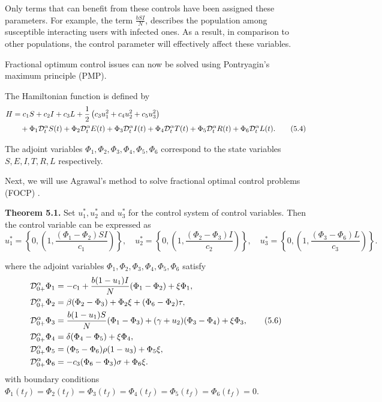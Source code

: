 \documentclass[10pt]{NSP1}
\newcommand{\CD}{\mathcal{D}}
\begin{document}
Only terms that can benefit from these controls have been assigned these parameters. For example, the term $\frac{b S I}{N}$, describes the population among susceptible interacting users with infected ones. As a result, in comparison to other populations, the control parameter will effectively affect these variables.

Fractional optimum control issues can now be solved using Pontryagin's maximum principle (PMP).

The Hamiltonian function is defined by
\begin{align}
H &= c_1 S + c_2 I + c_3 L + \frac{1}{2} \left( c_3 u_1^2 + c_4 u_2^2 + c_5 u_3^2 \right) \notag \\
&\quad + \Phi_1 \CD_t^\alpha S(t) + \Phi_2 \CD_t^\alpha E(t) + \Phi_3 \CD_t^\alpha I(t) + \Phi_4 \CD_t^\alpha T(t) + \Phi_5 \CD_t^\alpha R(t) + \Phi_6 \CD_t^\alpha L(t).
\tag{5.4}
\end{align}

The adjoint variables $\Phi_1, \Phi_2, \Phi_3, \Phi_4, \Phi_5, \Phi_6$ correspond to the state variables $S, E, I, T, R, L$ respectively.

Next, we will use Agrawal's method to solve fractional optimal control problems (FOCP) \cite{ref38}.

\textbf{Theorem 5.1.} Set $u_1^\ast, u_2^\ast$ and $u_3^\ast$ for the control system of control variables. Then the control variable can be expressed as
\begin{equation}
u_1^\ast = \left\{ 0, \left( 1, \frac{(\Phi_1 - \Phi_2) S I}{c_1} \right) \right\}, \quad
u_2^\ast = \left\{ 0, \left( 1, \frac{(\Phi_2 - \Phi_3) I}{c_2} \right) \right\}, \quad
u_3^\ast = \left\{ 0, \left( 1, \frac{(\Phi_3 - \Phi_6) L}{c_3} \right) \right\}.
\tag{5.5}
\end{equation}

where the adjoint variables $\Phi_1, \Phi_2, \Phi_3, \Phi_4, \Phi_5, \Phi_6$ satisfy
\begin{align}
\CD_{0+}^{\alpha} \Phi_1 &= -c_1 + \frac{b (1-u_1) I}{N} (\Phi_1 - \Phi_2) + \xi \Phi_1, \notag \\
\CD_{0+}^{\alpha} \Phi_2 &= \beta(\Phi_2 - \Phi_3) + \Phi_2 \xi + (\Phi_6 - \Phi_2) \tau, \notag \\
\CD_{0+}^{\alpha} \Phi_3 &= \frac{b (1-u_1) S}{N} (\Phi_1 - \Phi_3) + (\gamma + u_2)(\Phi_3 - \Phi_4) + \xi \Phi_3, \tag{5.6} \\
\CD_{0+}^{\alpha} \Phi_4 &= \delta(\Phi_4 - \Phi_5) + \xi \Phi_4, \notag \\
\CD_{0+}^{\alpha} \Phi_5 &= (\Phi_5 - \Phi_6) \rho (1-u_3) + \Phi_5 \xi, \notag \\
\CD_{0+}^{\alpha} \Phi_6 &= -c_3 (\Phi_6 - \Phi_3) \sigma + \Phi_6 \xi. \notag
\end{align}
with boundary conditions $\Phi_1(t_f) = \Phi_2(t_f) = \Phi_3(t_f) = \Phi_4(t_f) = \Phi_5(t_f) = \Phi_6(t_f) = 0$.
\end{document}
